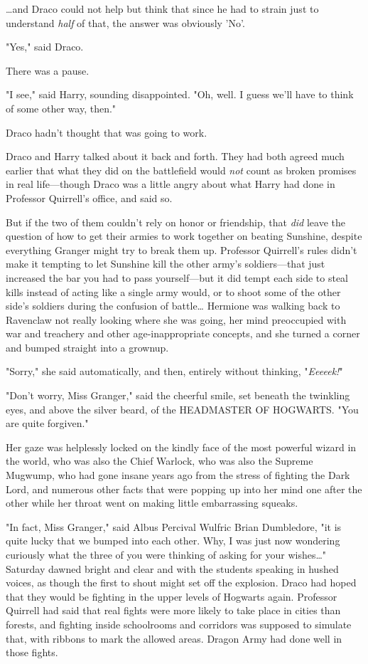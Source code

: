 {\ldots}and Draco could not help but think that since he had to strain just to 
understand \emph{half} of that, the answer was obviously 'No'.

"Yes," said Draco.

There was a pause.

"I see," said Harry, sounding disappointed. "Oh, well. I guess we'll have to 
think of some other way, then."

Draco hadn't thought that was going to work.

Draco and Harry talked about it back and forth. They had both agreed much 
earlier that what they did on the battlefield would \emph{not} count as broken 
promises in real life---though Draco was a little angry about what Harry had 
done in Professor Quirrell's office, and said so.

But if the two of them couldn't rely on honor or friendship, that \emph{did} 
leave the question of how to get their armies to work together on beating 
Sunshine, despite everything Granger might try to break them up. Professor 
Quirrell's rules didn't make it tempting to let Sunshine kill the other army's 
soldiers---that just increased the bar you had to pass yourself---but it did 
tempt each side to steal kills instead of acting like a single army would, or 
to shoot some of the other side's soldiers during the confusion of 
battle{\ldots}
\sbreak
Hermione was walking back to Ravenclaw not really looking where she was going, 
her mind preoccupied with war and treachery and other age-inappropriate 
concepts, and she turned a corner and bumped straight into a grownup.

"Sorry," she said automatically, and then, entirely without thinking, 
"\emph{Eeeeek!}"

"Don't worry, Miss Granger," said the cheerful smile, set beneath the twinkling 
eyes, and above the silver beard, of the HEADMASTER OF HOGWARTS. "You are quite 
forgiven."

Her gaze was helplessly locked on the kindly face of the most powerful wizard 
in the world, who was also the Chief Warlock, who was also the Supreme Mugwump, 
who had gone insane years ago from the stress of fighting the Dark Lord, and 
numerous other facts that were popping up into her mind one after the other 
while her throat went on making little embarrassing squeaks.

"In fact, Miss Granger," said Albus Percival Wulfric Brian Dumbledore, "it is 
quite lucky that we bumped into each other. Why, I was just now wondering 
curiously what the three of you were thinking of asking for your wishes{\ldots}"
\sbreak
Saturday dawned bright and clear and with the students speaking in hushed 
voices, as though the first to shout might set off the explosion.
\sbreak
Draco had hoped that they would be fighting in the upper levels of Hogwarts 
again. Professor Quirrell had said that real fights were more likely to take 
place in cities than forests, and fighting inside schoolrooms and corridors was 
supposed to simulate that, with ribbons to mark the allowed areas. Dragon Army 
had done well in those fights.

